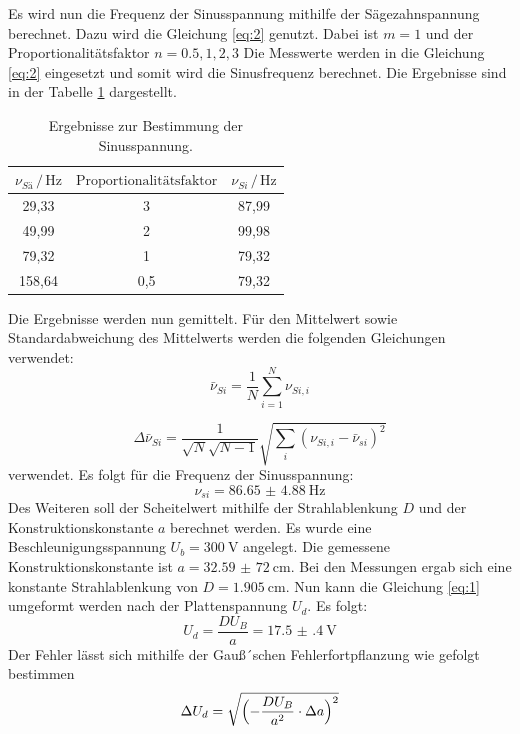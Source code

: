 Es wird nun die Frequenz der Sinusspannung mithilfe der Sägezahnspannung
berechnet.
Dazu wird die Gleichung \ref{eq:2} genutzt. Dabei ist $m = 1$ und der
Proportionalitätsfaktor $n= 0.5, 1, 2, 3$
Die Messwerte werden in die Gleichung \ref{eq:2} eingesetzt und somit wird die Sinusfrequenz berechnet.
Die Ergebnisse sind in der Tabelle \ref{tab:3} dargestellt.
\begin{table}[H]
  \centering
  \caption{Ergebnisse zur Bestimmung der Sinusspannung.}
  \label{tab:3}
  \begin{tabular}{c c c}
\toprule
$\nu_{Sä} \,/\, \si{\hertz}$& $\text{Proportionalitätsfaktor}$ & $\nu_{Si} \, /\, \si{\hertz}$\\
\midrule
29,33 & 3 & 87,99\\
49,99 & 2 & 99,98\\
79,32 & 1 & 79,32\\
158,64& 0,5& 79,32\\
\bottomrule
  \end{tabular}
\end{table}
Die Ergebnisse werden nun gemittelt.
Für den Mittelwert sowie Standardabweichung des Mittelwerts werden die folgenden Gleichungen verwendet:
\begin{equation*}
    \bar{\nu}_{Si}= \frac{1}{N} \sum_{i=1}^{N} \nu_{Si,i}
\end{equation*}

\begin{equation*}
  \Delta \bar{\nu}_{Si} = \frac{1}{\sqrt{N}\sqrt{N-1}} \sqrt{\sum_{i}(\nu_{Si,i}-\bar{\nu}_{si})^2}
\end{equation*}
verwendet.
Es folgt für die Frequenz der Sinusspannung:
\begin{equation*}
  \nu_{si}= \SI{86.65(488)}{\hertz}
\end{equation*}
Des Weiteren soll der Scheitelwert mithilfe der Strahlablenkung $D$ und der Konstruktionskonstante $a$ berechnet werden.
Es wurde eine Beschleunigungsspannung $U_b = \SI{300}{\volt}$ angelegt. Die gemessene Konstruktionskonstante ist
$a = \SI{32,59(72)}{\centi\meter}$.
Bei den Messungen ergab sich eine konstante Strahlablenkung von $D = \SI{1.905}{\centi\meter}$.
Nun kann die Gleichung \ref{eq:1} umgeformt werden nach  der Plattenspannung $U_d$.
Es folgt:
\begin{equation*}
  U_d = \frac{D U_B}{a} = \SI{17.5(4)}{\volt}
\end{equation*}
Der Fehler lässt sich mithilfe der Gauß´schen Fehlerfortpflanzung wie gefolgt bestimmen
\begin{equation}
  \Delta U_d = \sqrt{\Bigl(-\frac{DU_B}{a^2}\cdot \Delta a\Bigr)^2}
\end{equation}
